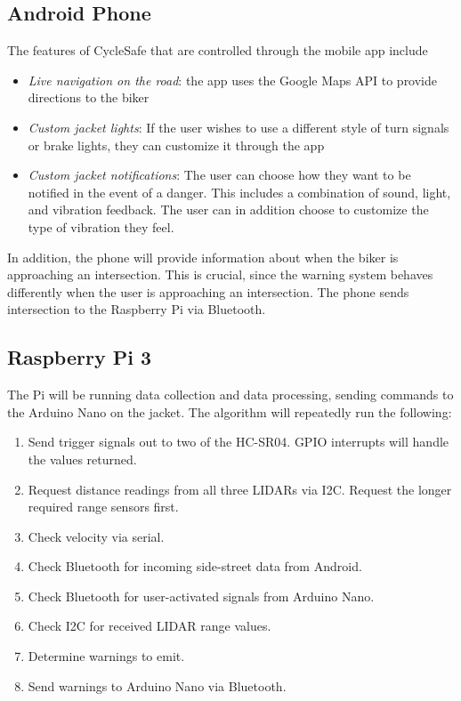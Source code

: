 \documentclass[journal]{IEEEtran}
\begin{document}
\subsection{Android Phone}
The features of CycleSafe that are controlled through the mobile app include
\begin{itemize}
    \item \textit{Live navigation on the road}: the app uses the Google Maps API to provide directions to the biker 
    \item \textit{Custom jacket lights}: If the user wishes to use a different style of turn signals or brake lights, they can customize it through the app
    \item \textit{Custom jacket notifications}: The user can choose how they want to be notified in the event of a danger. This includes a combination of sound, light, and vibration feedback. The user can in addition choose to customize the type of vibration they feel.
\end{itemize}
In addition, the phone will provide information about when the biker is approaching an intersection. This is crucial, since the warning system behaves differently when the user is approaching an intersection. The phone sends intersection to the Raspberry Pi via Bluetooth.


\subsection{Raspberry Pi 3}
The Pi will be running data collection and data processing, sending commands to the Arduino Nano on the jacket. The algorithm will repeatedly run the following:
\begin{enumerate}
    \item Send trigger signals out to two of the HC-SR04. GPIO interrupts will handle the values returned.
    \item Request distance readings from all three LIDARs via I2C. Request the longer required range sensors first.
    \item Check velocity via serial.
    \item Check Bluetooth for incoming side-street data from Android.
    \item Check Bluetooth for user-activated signals from Arduino Nano.
    \item Check I2C for received LIDAR range values.
    \item Determine warnings to emit.
    \item Send warnings to Arduino Nano via Bluetooth.
\end{enumerate}
\end{document}
